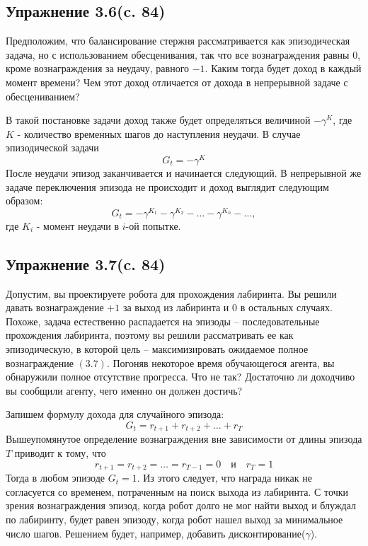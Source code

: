 \subsection{Упражнение 3.6(c. 84)}
Предположим, что балансирование стержня рассматривается как эпизодическая задача, но с  использованием обесценивания, так что все вознаграждения равны $0$, кроме вознаграждения за неудачу, равного $-1$. Каким тогда будет доход в каждый момент времени? Чем этот доход отличается от дохода в непрерывной задаче с обесцениванием?
\begin{solution}
    В такой постановке задачи доход также будет определяться величиной $-\gamma^K$, где $K$ - количество временных шагов до наступления неудачи. В случае эпизодической задачи 
    \[G_t = -\gamma^K\]
    После неудачи эпизод заканчивается и начинается следующий. В непрерывной же задаче переключения эпизода не происходит и доход выглядит следующим образом:
    \[G_t = -\gamma^{K_1} - \gamma^{K_2} - \dots - \gamma^{K_n} - \dots,\]
    где $K_i$ - момент неудачи в $i$-ой попытке.
\end{solution}

\subsection{Упражнение 3.7(c. 84)}
Допустим, вы проектируете робота для прохождения лабиринта. Вы решили давать вознаграждение $+1$ за выход из лабиринта и $0$ в остальных случаях. Похоже, задача естественно распадается на эпизоды – последовательные прохождения лабиринта, поэтому вы решили рассматривать ее как эпизодическую, в которой цель – максимизировать ожидаемое полное вознаграждение $(3.7)$. Погоняв некоторое время обучающегося агента, вы обнаружили полное отсутствие прогресса. Что не так? Достаточно ли доходчиво вы сообщили агенту, чего именно он должен достичь?
\begin{solution}
    Запишем формулу дохода для случайного эпизода:
    \[G_t = r_{t+1} + r_{t+2} + \dots + r_T\]
    Вышеупомянутое определение вознаграждения вне зависимости от длины эпизода $T$ приводит к тому, что
    \[r_{t+1} = r_{t+2} = \dots = r_{T-1} = 0 \quad \text{и} \quad r_T = 1\]
    Тогда в любом эпизоде $G_t = 1$. Из этого следует, что награда никак не согласуется со временем, потраченным на поиск выхода из лабиринта. С точки зрения вознаграждения эпизод, когда робот долго не мог найти выход и блуждал по лабиринту, будет равен эпизоду, когда робот нашел выход за минимальное число шагов. Решением будет, например, добавить дисконтирование($\gamma$).
\end{solution}

